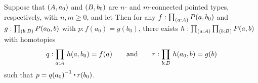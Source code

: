 \documentclass[hott-all.tex]{subfiles}
\begin{document}
% 
% 
\begin{lem}
  Suppose that ${\mathopen{}(A,a_0)\mathclose{}}$ and ${\mathopen{}(B,b_0)\mathclose{}}$ are $n$- and $m$-connected pointed types, respectively, with $n,m\geq0$, and let
%
%
Then for any ${f:\prd{a:A} P(a,b_0)}$ and ${g:\prd{b:B} P(a_0,b)}$ with $p:f(a_0) = g(b_0)$, there exists $h:\prd{a:A}{b:B} P(a,b)$ with homotopies
%
\begin{equation*}
  q:\prd{a:A} h(a,b_0)=f(a)
  \qquad\text{and}\qquad
  r:\prd{b:B} h(a_0,b)=g(b)
 \end{equation*}
%
such that $p = \opp{q(a_0)} \ct r(b_0)$.
\end{lem}
% 
\end{document}
